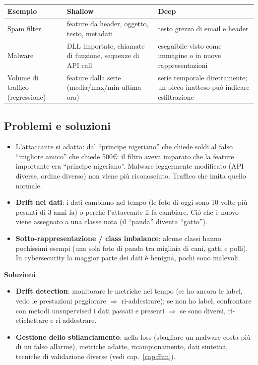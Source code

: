\begin{center}
\small
\begin{tabularx}{\textwidth}{l X X}
\toprule
\textbf{Esempio} & \textbf{Shallow} & \textbf{Deep}\\
\midrule
Spam filter & feature da header, oggetto, testo, metadati & testo grezzo di email e header\\
Malware & DLL importate, chiamate di funzione, sequenze di API call & eseguibile visto come immagine o in nuove rappresentazioni\\
Volume di traffico (regressione) & feature dalla serie (media/max/min ultima ora) & serie temporale direttamente; un picco inatteso può indicare esfiltrazione\\
\bottomrule
\end{tabularx}
\end{center}

\subsection{Problemi e soluzioni}
\begin{itemize}
  \item L'attaccante si adatta: dal ``principe nigeriano'' che chiede soldi al falso ``migliore amico'' che chiede 500€:
        il filtro aveva imparato che la feature importante era ``principe nigeriano''. Malware leggermente modificato
        (API diverse, ordine diverso) non viene più riconosciuto. Traffico che imita quello normale.
  \item \textbf{Drift nei dati}: i dati cambiano nel tempo (le foto di oggi sono 10 volte più pesanti di 3 anni fa)
        o perché l'attaccante li fa cambiare. Ciò che è nuovo viene assegnato a una classe nota (il ``panda'' diventa ``gatto'').
  \item \textbf{Sotto-rappresentazione / class imbalance}: alcune classi hanno pochissimi esempi (una sola foto di panda
        tra migliaia di cani, gatti e polli). In cybersecurity la maggior parte dei dati è benigna, pochi sono malevoli.
\end{itemize}
\textbf{Soluzioni}
\begin{itemize}
  \item \textbf{Drift detection}: monitorare le metriche nel tempo (se ho ancora le label, vedo le prestazioni peggiorare
        $\Rightarrow$ ri-addestrare); se non ho label, confrontare con metodi unsupervised i dati passati e presenti
        $\Rightarrow$ se sono diversi, ri-etichettare e ri-addestrare.
  \item \textbf{Gestione dello sbilanciamento}:  nella loss (sbagliare un malware costa più di un falso allarme),
        metriche adatte, ricampionamento, dati sintetici, tecniche di validazione diverse (vedi cap.~\ref{cap:ffnn}).
\end{itemize}

